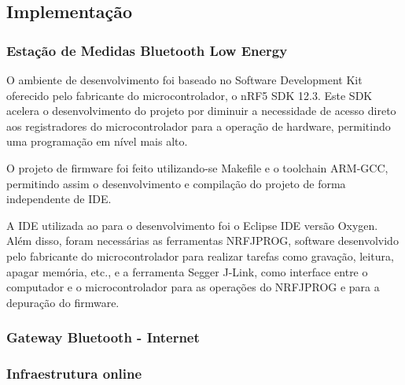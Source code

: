 

\subsection{Implementação}

\subsubsection{Estação de Medidas Bluetooth Low Energy}


O ambiente de desenvolvimento foi baseado no Software Development Kit oferecido
pelo fabricante do microcontrolador, o nRF5 SDK 12.3. Este SDK acelera o
desenvolvimento do projeto por diminuir a necessidade de acesso direto aos
registradores do microcontrolador para a operação de hardware, permitindo uma
programação em nível mais alto.
 
O projeto de firmware foi feito utilizando-se Makefile e o toolchain ARM-GCC,
permitindo assim o desenvolvimento e compilação do projeto de forma
independente de IDE.

A IDE utilizada ao para o desenvolvimento foi o Eclipse IDE versão Oxygen. Além
disso, foram necessárias as ferramentas NRFJPROG, software desenvolvido pelo
fabricante do microcontrolador para realizar tarefas como gravação, leitura,
apagar memória, etc., e a ferramenta Segger J-Link, como interface entre o
computador e o microcontrolador para as operações do NRFJPROG e para a
depuração do firmware. 

 






\subsubsection{Gateway Bluetooth - Internet}

\subsubsection{Infraestrutura online}
